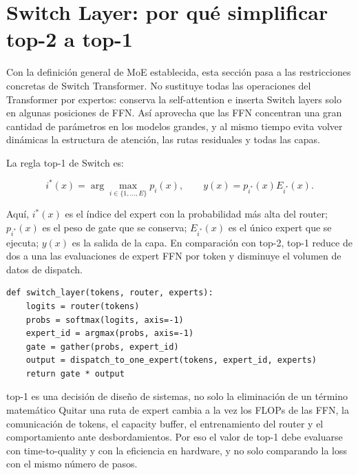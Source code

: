 \section{Switch Layer: por qué simplificar top-2 a top-1}

Con la definición general de MoE establecida, esta sección pasa a las restricciones concretas de Switch Transformer. No sustituye todas las operaciones del Transformer por expertos: conserva la self-attention e inserta Switch layers solo en algunas posiciones de FFN. Así aprovecha que las FFN concentran una gran cantidad de parámetros en los modelos grandes, y al mismo tiempo evita volver dinámicas la estructura de atención, las rutas residuales y todas las capas.


La regla top-1 de Switch es:

\[
i^*(x)=\arg\max_{i\in\{1,\ldots,E\}}p_i(x),
\qquad
y(x)=p_{i^*}(x)E_{i^*}(x).
\]

Aquí, $i^*(x)$ es el índice del expert con la probabilidad más alta del router; $p_{i^*}(x)$ es el peso de gate que se conserva; $E_{i^*}(x)$ es el único expert que se ejecuta; $y(x)$ es la salida de la capa. En comparación con top-2, top-1 reduce de dos a una las evaluaciones de expert FFN por token y disminuye el volumen de datos de dispatch.

\begin{lstlisting}[caption={Pseudocódigo conceptual del enrutamiento top-1 de Switch.}]
def switch_layer(tokens, router, experts):
    logits = router(tokens)
    probs = softmax(logits, axis=-1)
    expert_id = argmax(probs, axis=-1)
    gate = gather(probs, expert_id)
    output = dispatch_to_one_expert(tokens, expert_id, experts)
    return gate * output
\end{lstlisting}

\begin{importantbox}{top-1 es una decisión de diseño de sistemas, no solo la eliminación de un término matemático}
Quitar una ruta de expert cambia a la vez los FLOPs de las FFN, la comunicación de tokens, el capacity buffer, el entrenamiento del router y el comportamiento ante desbordamientos. Por eso el valor de top-1 debe evaluarse con time-to-quality y con la eficiencia en hardware, y no solo comparando la loss con el mismo número de pasos.
\end{importantbox}

